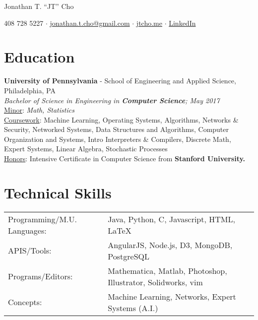 \documentclass{resume}[10pt, a4paper]
\begin{document}
\begin{center}
    \huge Jonathan T. ``JT'' Cho
\end{center}


\begin{center}
    \large 408 728 5227 $\cdot$ \href{mailto:jonathan.t.cho@gmail.com}{jonathan.t.cho@gmail.com} $\cdot$ \href{http://jtcho.me}{jtcho.me} $\cdot$ \href{https://www.linkedin.com/in/jtcho}{LinkedIn}
\end{center}

\section{Education}
\textbf{University of Pennsylvania} - School of Engineering and Applied Science, Philadelphia, PA\\
\textit{Bachelor of Science in Engineering in \textbf{Computer Science}; May 2017}\\
\ul{Minor}: \textit{Math, Statistics}\\
\ul{Coursework}:
Machine Learning, Operating Systems, Algorithms, Networks \& Security, Networked Systems, Data Structures and Algorithms, Computer Organization and Systems, Intro Interpreters \& Compilers, Discrete Math, Expert Systems, Linear Algebra, Stochastic Processes\\
\ul{Honors}: Intensive Certificate in Computer Science from \textbf{Stanford University.}

\section{Technical Skills}
\begin{tabular}{l l}
    Programming/M.U. Languages:&Java, Python, C, Javascript, HTML, \LaTeX\\
               APIS/Tools:&AngularJS, Node.js, D3, MongoDB, PostgreSQL\\
         Programs/Editors:&Mathematica, Matlab, Photoshop, Illustrator, Solidworks, vim\\
                 Concepts:&Machine Learning, Networks, Expert Systems (A.I.)
\end{tabular}
\end{document}
